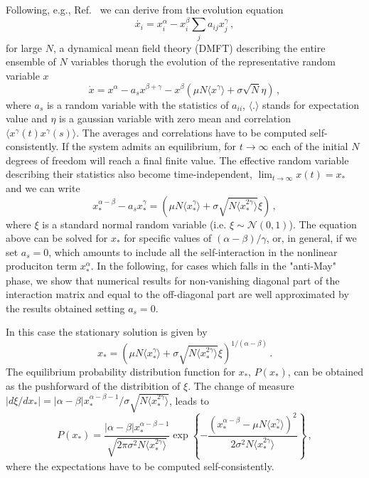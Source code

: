 \documentclass[
 reprint,
 amsmath,amssymb,
 aps,
]{revtex4-2}
\begin{document}
Following, e.g., Ref.~\cite{Roy2019} we can derive from 
the evolution equation
\begin{equation}
    \dot{x_i}=x_i^{\alpha} - x_i^{\beta}\sum_{j}a_{ij}x_j^{\gamma} \, ,
\label{eq: full abg}
\end{equation}
for large $N$, a dynamical mean field theory (DMFT) 
describing the entire ensemble of $N$ variables
thorugh the evolution of the representative random variable $x$
\begin{equation}
    \dot{x} = x^{\alpha}-a_sx^{\beta+\gamma}-x^{\beta}\left( \mu N \langle x^{\gamma}\rangle + \sigma \sqrt{N} \eta\right) \, ,
\label{eq: dmft}
\end{equation}
where $a_s$ is a random variable with the statistics of $a_{ii}$,
$\langle . \rangle$ stands for expectation value
and $\eta$ is a gaussian variable
with zero mean and correlation 
$\langle x^{\gamma}(t)x^{\gamma}(s)\rangle$. 
The averages and correlations have to be computed self-consistently.
If the system admits an equilibrium, for 
$t\to\infty$ each of the initial $N$ degrees 
of freedom will reach a final finite value. 
The effective random variable describing their statistics
also become time-independent,
$\lim_{t\to\infty}x(t)=x_*$ and we can write
\begin{equation}
    x_*^{\alpha-\beta} - a_s x_*^{\gamma}= \left( \mu N \langle x_*^{\gamma}\rangle + \sigma \sqrt{N\langle x_*^{2\gamma}\rangle}\xi\right) \, ,
\end{equation} 
where $\xi$ is a standard normal random variable (i.e. $\xi\sim\mathcal{N}(0,1)$).
The equation above can be solved for $x_*$ for specific values of
$(\alpha-\beta)/\gamma$, or, in general, if we set $a_s=0$, which amounts to include
all the self-interaction in the nonlinear produciton term
$x_*^{\alpha}$. In the following, for cases which
falls in the "anti-May" phase, we show that numerical results
for non-vanishing diagonal part of the
interaction matrix and equal to the
off-diagonal part are well approximated by the results obtained
setting $a_s=0$.

In this case the stationary solution is given by 
\begin{equation} \label{eq: cavity solution}
    x_* = \left( \mu N \langle x_*^{\gamma}\rangle + \sigma \sqrt{N\langle x_*^{2\gamma}\rangle}\xi\right)^{1/(\alpha-\beta)} \, .
\end{equation}
The equilibrium probability distribution function for $x_*$, $P(x_*)$,
can be obtained as the pushforward of the distribition of $\xi$.
The change of measure
$\left|d \xi/d x_*\right|=|\alpha-\beta|x_*^{\alpha-\beta-1}/\sigma \sqrt{N\langle x_*^{2\gamma}\rangle}$,
leads to
\begin{equation}\label{eq: dist general}
    P(x_*)=\frac{|\alpha-\beta|x_*^{\alpha-\beta-1}}{\sqrt{2\pi\sigma^2 N\langle x_*^{2\gamma}\rangle}}
    \exp{\left\{-\frac{(x_*^{\alpha-\beta}-\mu N\langle x_*^{\gamma}\rangle)^2}{2\sigma^2N\langle x_*^{2\gamma}\rangle}\right\}} \, ,
\end{equation}
where the expectations have to be computed self-consistently.
\end{document}
